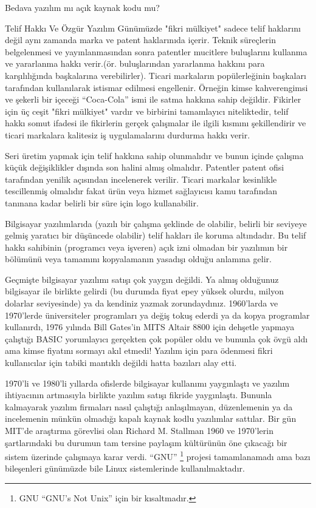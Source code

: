 \begin{section}{Bedava yazılım mı açık kaynak kodu mu?}
\begin{subsection}{Telif Hakkı Ve Özgür Yazılım}
Günümüzde "fikri mülkiyet" sadece telif haklarını değil aynı zamanda marka ve patent haklarınıda içerir. Teknik süreçlerin belgelenmesi  ve yayınlanmasından sonra patentler mucitlere buluşlarını kullanma ve yararlanma hakkı verir.(ör. buluşlarından yararlanma hakkını para karşılılığında başkalarına verebilirler). Ticari markaların popülerleğinin başkaları tarafından kullanılarak istismar edilmesi engellenir. Örneğin kimse  kahverengimsi ve şekerli bir içeceği “Coca-Cola” ismi ile satma hakkına sahip değildir. Fikirler için üç ceşit "fikri mülkiyet"  vardır ve birbirini tamamlayıcı niteliktedir, telif hakkı somut ifadesi ile fikirlerin gerçek çalışmalar ile ilgili kısmını şekillendirir ve ticari markalara  kalitesiz iş uygulamalarını durdurma hakkı verir.

Seri üretim yapmak için telif hakkına sahip olunmalıdır ve bunun içinde çalışma küçük değişiklikler dışında son halini almış olmalıdır. Patentler patent ofisi tarafından yenilik açısından incelenerek verilir. Ticari markalar kesinlikle tescillenmiş olmalıdır fakat ürün veya hizmet sağlayıcısı kamu tarafından tanınana kadar belirli bir süre için logo kullanabilir.

Bilgisayar yazılımlarıda (yazılı bir çalışma şeklinde de olabilir, belirli bir seviyeye gelmiş yaratıcı bir düşüncede olabilir) telif hakları ile koruma altındadır. Bu telif hakkı sahibinin (programcı veya işveren) açık izni olmadan bir yazılımın bir bölümünü veya tamamını kopyalamanın yasadışı olduğu anlamına gelir.

Geçmişte bilgisayar yazılımı satışı çok yaygın değildi. Ya almış olduğunuz bilgisayar ile birlikte gelirdi (bu durumda fiyat epey yüksek olurdu, milyon dolarlar seviyesinde) ya da kendiniz yazmak zorundaydınız. 1960'larda ve 1970'lerde üniversiteler programları ya değiş tokuş ederdi ya da kopya programlar kullanırdı, 1976 yılında Bill Gates'in MITS Altair 8800 için dehşetle yapmaya çalıştığı BASIC yorumlayıcı gerçekten çok popüler oldu ve bununla çok övgü aldı ama kimse fiyatını sormayı akıl etmedi! Yazılım için para ödenmesi fikri kullanıcılar için tabiki mantıklı değildi hatta bazıları alay etti.

1970'li ve 1980'li yıllarda ofislerde bilgisayar kullanımı yaygınlaştı ve yazılım ihtiyacının artmasıyla birlikte yazılım satışı fikride yaygınlaştı. Bununla kalmayarak yazılım firmaları nasıl çalıştığı anlaşılmayan, düzenlemenin ya da incelemenin münkün olmadığı kapalı kaynak kodlu yazılımlar sattılar. Bir gün MIT'de araştırma görevlisi olan Richard M. Stallman 1960 ve 1970'lerin şartlarındaki bu durumun tam tersine paylaşım kültürünün öne çıkacağı bir sistem üzerinde çalışmaya karar verdi. “GNU”
\footnote{GNU “GNU’s Not Unix” için bir kısaltmadır.} projesi tamamlanamadı ama bazı bileşenleri günümüzde bile Linux sistemlerinde kullanılmaktadır.


\end{subsection}
\end{section}
